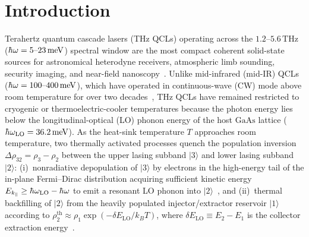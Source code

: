 \documentclass[11pt,letterpaper]{article}
\renewcommand{\hbar}{\mathchar'26\mkern-9mu h}
\begin{document}
\begin{abstract}
three-well wafer G936 and $261\,\mathrm{K}$ two-well wafer G938, we design a step-graded over-resonant two-well cascade (SGCB-54, $x_{\mathrm{int}}=0.22$, $x_{\mathrm{core}}=0.42$, $\delta E_{\mathrm{LO}}=54.0\,\mathrm{meV}$) that cuts the $260\,\mathrm{K}$ transition half-width from $2.21\,\mathrm{meV}$ to $1.39\,\mathrm{meV}$ and raises the predicted pulsed ceiling in a $\mathrm{Cu}$--$\mathrm{Cu}$ double-metal waveguide to $T_{\max} = 289.4\,\mathrm{K}$.
\end{abstract}

\section{Introduction}
\label{sec:intro}

Terahertz quantum cascade lasers (THz QCLs) operating across the $1.2\text{--}5.6\,\mathrm{THz}$ ($\hbar\omega = 5\text{--}23\,\mathrm{meV}$) spectral window are the most compact coherent solid-state sources for astronomical heterodyne receivers, atmospheric limb sounding, security imaging, and near-field nanoscopy~\cite{Kohler2002,Williams2007,Vitiello2015,SilvestriRoadmap2025}. Unlike mid-infrared (mid-IR) QCLs ($\hbar\omega = 100\text{--}400\,\mathrm{meV}$), which have operated in continuous-wave (CW) mode above room temperature for over two decades~\cite{Beck2002,Bai2011,Vurgaftman2021}, THz QCLs have remained restricted to cryogenic or thermoelectric-cooler temperatures because the photon energy lies below the longitudinal-optical (LO) phonon energy of the host $\mathrm{GaAs}$ lattice ($\hbar\omega_{\mathrm{LO}} = 36.2\,\mathrm{meV}$). As the heat-sink temperature $T$ approaches room temperature, two thermally activated processes quench the population inversion $\Delta\rho_{32} = \rho_3 - \rho_2$ between the upper lasing subband $|3\rangle$ and lower lasing subband $|2\rangle$: (i)~nonradiative depopulation of $|3\rangle$ by electrons in the high-energy tail of the in-plane Fermi--Dirac distribution acquiring sufficient kinetic energy $E_{k_\parallel} \ge \hbar\omega_{\mathrm{LO}} - \hbar\omega$ to emit a resonant LO phonon into $|2\rangle$~\cite{Williams2007,Albo2015,Jirauschek2014}, and (ii)~thermal backfilling of $|2\rangle$ from the heavily populated injector/extractor reservoir $|1\rangle$ according to $\rho_2^{\mathrm{th}} \approx \rho_1 \exp(-\delta E_{\mathrm{LO}}/k_B T)$, where $\delta E_{\mathrm{LO}} \equiv E_2 - E_1$ is the collector extraction energy~\cite{Vurgaftman2021,Khalatpour2021}.
\end{document}
